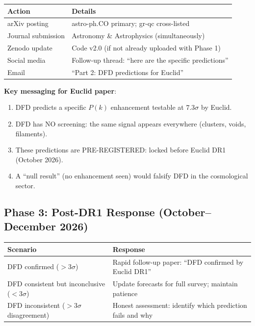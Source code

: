 \documentclass[11pt,a4paper]{article}
\begin{document}
\begin{center}
\begin{tabular}{lp{8cm}}
\toprule
\textbf{Action} & \textbf{Details} \\
\midrule
arXiv posting & astro-ph.CO primary; gr-qc cross-listed \\
Journal submission & Astronomy \& Astrophysics (simultaneously) \\
Zenodo update & Code v2.0 (if not already uploaded with Phase 1) \\
Social media & Follow-up thread: ``here are the specific predictions'' \\
Email & ``Part 2: DFD predictions for Euclid'' \\
\bottomrule
\end{tabular}
\end{center}

\textbf{Key messaging for Euclid paper}:
\begin{enumerate}
\item DFD predicts a specific $P(k)$ enhancement testable at $7.3\sigma$ by Euclid.
\item DFD has NO screening: the same signal appears everywhere (clusters, voids, filaments).
\item These predictions are PRE-REGISTERED: locked before Euclid DR1 (October 2026).
\item A ``null result'' (no enhancement seen) would falsify DFD in the cosmological sector.
\end{enumerate}

\subsection{Phase 3: Post-DR1 Response (October--December 2026)}

\begin{center}
\begin{tabular}{lp{8cm}}
\toprule
\textbf{Scenario} & \textbf{Response} \\
\midrule
DFD confirmed ($> 3\sigma$) & Rapid follow-up paper: ``DFD confirmed by Euclid DR1'' \\
DFD consistent but inconclusive ($< 3\sigma$) & Update forecasts for full survey; maintain patience \\
DFD inconsistent ($> 3\sigma$ disagreement) & Honest assessment: identify which prediction fails and why \\
\bottomrule
\end{tabular}
\end{center}
\end{document}

